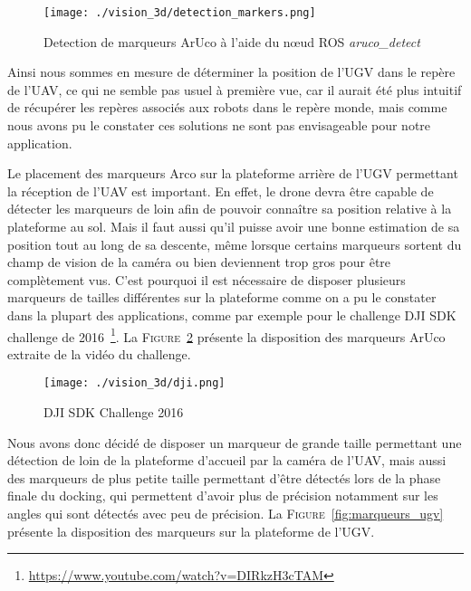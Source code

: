     \begin{figure}[!htb]
        \centering
        \texttt{[image: ./vision\_3d/detection\_markers.png]}
        \caption{Detection de marqueurs ArUco à l'aide du n\oe ud ROS \textit{aruco\_detect}}
        \label{fig:detection}
    \end{figure}

    Ainsi nous sommes en mesure de déterminer la position de l’UGV dans le repère de l’UAV, ce qui ne semble pas usuel à première vue, car il aurait été plus intuitif de récupérer les repères associés aux robots dans le repère monde, mais comme nous avons pu le constater ces solutions ne sont pas envisageable pour notre application.

    Le placement des marqueurs Arco sur la plateforme arrière de l’UGV permettant la réception de l’UAV est important. En effet, le drone devra être capable de détecter les marqueurs de loin afin de pouvoir connaître sa position relative à la plateforme au sol. Mais il faut aussi qu’il puisse avoir une bonne estimation de sa position tout au long de sa descente, même lorsque certains marqueurs sortent du champ de vision de la caméra ou bien deviennent trop gros pour être complètement vus. C’est pourquoi il est nécessaire de disposer plusieurs marqueurs de tailles différentes sur la plateforme comme on a pu le constater dans la plupart des applications, comme par exemple pour le challenge DJI SDK challenge de 2016~\footnote{\url{https://www.youtube.com/watch?v=DIRkzH3cTAM}}. La \textsc{Figure}~\ref{fig:dji} présente la disposition des marqueurs ArUco extraite de la vidéo du challenge.

    \begin{figure}[!htb]
        \centering
        \texttt{[image: ./vision\_3d/dji.png]}
        \caption{DJI SDK Challenge 2016}
        \label{fig:dji}
    \end{figure}

    Nous avons donc décidé de disposer un marqueur de grande taille permettant une détection de loin de la plateforme d’accueil par la caméra de l’UAV, mais aussi des marqueurs de plus petite taille permettant d’être détectés lors de la phase finale du docking, qui permettent d’avoir plus de précision notamment sur les angles qui sont détectés avec peu de précision. La \textsc{Figure}~\ref{fig:marqueurs_ugv} présente la disposition des marqueurs sur la plateforme de l'UGV.
    
